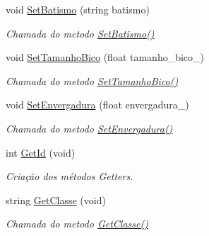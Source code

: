 \begin{DoxyCompactItemize}
\mbox{\label{class_ave_a9e414f7bb59aae864f313b4be840d49c}} 
void \mbox{\hyperlink{class_ave_a9e414f7bb59aae864f313b4be840d49c}{Set\+Batismo}} (string batismo)
\begin{DoxyCompactList}\small\item\em Chamada do metodo \mbox{\hyperlink{class_ave_a9e414f7bb59aae864f313b4be840d49c}{Set\+Batismo()}} \end{DoxyCompactList}\item 
\mbox{\label{class_ave_a65e15e29bf02bb6842ca16e6d5b18708}} 
void \mbox{\hyperlink{class_ave_a65e15e29bf02bb6842ca16e6d5b18708}{Set\+Tamanho\+Bico}} (float tamanho\+\_\+bico\+\_\+)
\begin{DoxyCompactList}\small\item\em Chamada do metodo \mbox{\hyperlink{class_ave_a65e15e29bf02bb6842ca16e6d5b18708}{Set\+Tamanho\+Bico()}} \end{DoxyCompactList}\item 
\mbox{\label{class_ave_aa5180cce1170f89f2d8cb547a4871dd8}} 
void \mbox{\hyperlink{class_ave_aa5180cce1170f89f2d8cb547a4871dd8}{Set\+Envergadura}} (float envergadura\+\_\+)
\begin{DoxyCompactList}\small\item\em Chamada do metodo \mbox{\hyperlink{class_ave_aa5180cce1170f89f2d8cb547a4871dd8}{Set\+Envergadura()}} \end{DoxyCompactList}\item 
int \mbox{\hyperlink{class_ave_a5c3d1e3b7b356a08b2fddd242c2fa426}{Get\+Id}} (void)
\begin{DoxyCompactList}\small\item\em Criação dos métodos Getters. \end{DoxyCompactList}\item 
\mbox{\label{class_ave_a1bea1200baf9ecc47899b6797a86c675}} 
string \mbox{\hyperlink{class_ave_a1bea1200baf9ecc47899b6797a86c675}{Get\+Classe}} (void)
\begin{DoxyCompactList}\small\item\em Chamada do metodo \mbox{\hyperlink{class_ave_a1bea1200baf9ecc47899b6797a86c675}{Get\+Classe()}} \end{DoxyCompactList}\item 
\mbox{\label{class_ave_ae9085c0c2d1ac90fa5c659f15ac7955d}} 

\end{DoxyCompactItemize}
